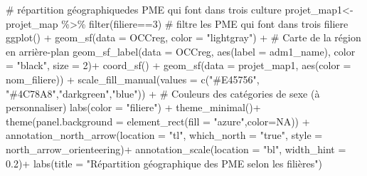 \documentclass[
  letterpaper,
  DIV=11,
  numbers=noendperiod]{scrartcl}
\newenvironment{Shaded}{\begin{snugshade}}{\end{snugshade}}
\newcommand{\AttributeTok}[1]{\textcolor[rgb]{0.40,0.45,0.13}{#1}}
\newcommand{\CommentTok}[1]{\textcolor[rgb]{0.37,0.37,0.37}{#1}}
\newcommand{\ConstantTok}[1]{\textcolor[rgb]{0.56,0.35,0.01}{#1}}
\newcommand{\DecValTok}[1]{\textcolor[rgb]{0.68,0.00,0.00}{#1}}
\newcommand{\FloatTok}[1]{\textcolor[rgb]{0.68,0.00,0.00}{#1}}
\newcommand{\FunctionTok}[1]{\textcolor[rgb]{0.28,0.35,0.67}{#1}}
\newcommand{\NormalTok}[1]{\textcolor[rgb]{0.00,0.23,0.31}{#1}}
\newcommand{\OtherTok}[1]{\textcolor[rgb]{0.00,0.23,0.31}{#1}}
\newcommand{\SpecialCharTok}[1]{\textcolor[rgb]{0.37,0.37,0.37}{#1}}
\newcommand{\StringTok}[1]{\textcolor[rgb]{0.13,0.47,0.30}{#1}}
\begin{document}
\begin{Shaded}
\begin{Highlighting}[]
\CommentTok{\# répartition géographiquedes PME qui font dans trois  culture}
\NormalTok{projet\_map1}\OtherTok{\textless{}{-}}\NormalTok{projet\_map }\SpecialCharTok{\%\textgreater{}\%} \FunctionTok{filter}\NormalTok{(filiere}\SpecialCharTok{==}\DecValTok{3}\NormalTok{) }\CommentTok{\# filtre les PME qui font dans trois filiere}
\FunctionTok{ggplot}\NormalTok{() }\SpecialCharTok{+}
  \FunctionTok{geom\_sf}\NormalTok{(}\AttributeTok{data =}\NormalTok{ OCCreg, }\AttributeTok{color =} \StringTok{"lightgray"}\NormalTok{) }\SpecialCharTok{+}  \CommentTok{\# Carte de la région en arrière{-}plan}
  \FunctionTok{geom\_sf\_label}\NormalTok{(}\AttributeTok{data =}\NormalTok{ OCCreg, }\FunctionTok{aes}\NormalTok{(}\AttributeTok{label =}\NormalTok{ adm1\_name), }\AttributeTok{color =} \StringTok{"black"}\NormalTok{, }\AttributeTok{size =} \DecValTok{2}\NormalTok{)}\SpecialCharTok{+}
  \FunctionTok{coord\_sf}\NormalTok{() }\SpecialCharTok{+}
  \FunctionTok{geom\_sf}\NormalTok{(}\AttributeTok{data =}\NormalTok{ projet\_map1, }\FunctionTok{aes}\NormalTok{(}\AttributeTok{color =}\NormalTok{ nom\_filiere)) }\SpecialCharTok{+}
  \FunctionTok{scale\_fill\_manual}\NormalTok{(}\AttributeTok{values =} \FunctionTok{c}\NormalTok{(}\StringTok{"\#E45756"}\NormalTok{, }\StringTok{"\#4C78A8"}\NormalTok{,}\StringTok{"darkgreen"}\NormalTok{,}\StringTok{"blue"}\NormalTok{)) }\SpecialCharTok{+}  \CommentTok{\# Couleurs des catégories de sexe (à personnaliser)}
  \FunctionTok{labs}\NormalTok{(}\AttributeTok{color =} \StringTok{"filiere"}\NormalTok{) }\SpecialCharTok{+}
  \FunctionTok{theme\_minimal}\NormalTok{()}\SpecialCharTok{+}
  \FunctionTok{theme}\NormalTok{(}\AttributeTok{panel.background =} \FunctionTok{element\_rect}\NormalTok{(}\AttributeTok{fill =} \StringTok{"azure"}\NormalTok{,}\AttributeTok{color=}\ConstantTok{NA}\NormalTok{)) }\SpecialCharTok{+}
  \FunctionTok{annotation\_north\_arrow}\NormalTok{(}\AttributeTok{location =} \StringTok{"tl"}\NormalTok{, }\AttributeTok{which\_north =} \StringTok{"true"}\NormalTok{, }\AttributeTok{style =}\NormalTok{ north\_arrow\_orienteering)}\SpecialCharTok{+}
  \FunctionTok{annotation\_scale}\NormalTok{(}\AttributeTok{location =} \StringTok{"bl"}\NormalTok{, }\AttributeTok{width\_hint =} \FloatTok{0.2}\NormalTok{)}\SpecialCharTok{+}
  \FunctionTok{labs}\NormalTok{(}\AttributeTok{title =} \StringTok{"Répartition géographique des PME selon les filières"}\NormalTok{)}
\end{Highlighting}
\end{Shaded}
\end{document}

